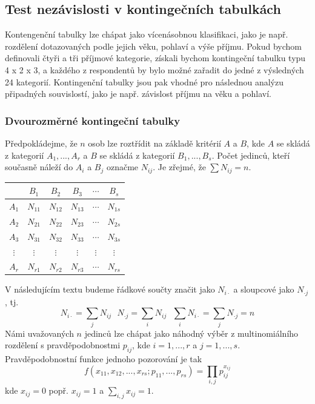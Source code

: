 \subsection{Test nezávislosti v kontingečních tabulkách}

Kontengenční tabulky lze chápat jako vícenásobnou klasifikaci, jako je např. rozdělení dotazovaných podle jejich věku, pohlaví a výše příjmu. Pokud bychom definovali čtyři a tři příjmové kategorie, získali bychom kontingeční tabulku typu 4 x 2 x 3, a každého z respondentů by bylo možné zařadit do jedné z výsledných 24 kategorií. Kontingenční tabulky jsou pak vhodné pro následnou analýzu připadných souvislostí, jako je např. závislost příjmu na věku a pohlaví.

\subsubsection{Dvourozměrné kontingeční tabulky}

Předpokládejme, že $n$ osob lze roztřídit na základě kritérií $A$ a $B$, kde $A$ se skládá z kategorií $A_1, ..., A_r$ a $B$ se skládá z kategorií $B_1, ..., B_s$. Počet jedinců, kteří současně náleží do $A_i$ a $B_j$ označme $N_{ij}$. Je zřejmé, že $\sum N_{ij} = n$.
\begin{center}
  \begin{tabular}{|c|c|c|c|c|c|}
    \hline
    \textbf{} & \textbf{$B_1$} & \textbf{$B_2$} & \textbf{$B_3$} & \textbf{$\cdots$} & \textbf{$B_s$}\\
    \hline
    \textbf{$A_1$} & $N_{11}$ & $N_{12}$ & $N_{13}$ & $\cdots$ & $N_{1s}$\\
    \hline
    \textbf{$A_2$} & $N_{21}$ & $N_{22}$ & $N_{23}$ & $\cdots$ & $N_{2s}$\\
    \hline
    \textbf{$A_3$} & $N_{31}$ & $N_{32}$ & $N_{33}$ & $\cdots$ & $N_{3s}$\\
    \hline
    \textbf{$\vdots$} & $\vdots$ & $\vdots$ & $\vdots$ & $\vdots$ & $\vdots$\\
    \hline
    \textbf{$A_r$} & $N_{r1}$ & $N_{r2}$ & $N_{r3}$ & $\cdots$ & $N_{rs}$\\
    \hline
  \end{tabular}
\end{center}
V následujícím textu budeme řádkové součty značit jako $N_{i \cdot}$ a sloupcové jako $N_{\cdot j}$, tj.
\begin{equation*}
N_{i \cdot} = \sum_j N_{ij} ~~~ N_{\cdot j} = \sum_i N_{ij} ~~~ \sum_i N_{i \cdot} = \sum_j N_{\cdot j} = n
\end{equation*}
Námi uvažovaných $n$ jedinců lze chápat jako náhodný výběr z multinomiálního rozdělení s pravděpodobnostmi $p_{ij}$, kde $i = 1, ..., r$ a $j = 1, ..., s$. Pravděpodobnostní funkce jednoho pozorování je tak
\begin{equation*}
f(x_{11}, x_{12}, ..., x_{rs}; p_{11}, ..., p_{rs}) = \prod_{i,j} p_{ij}^{x_{ij}}
\end{equation*}
kde
$x_{ij} = 0$ popř. $x_{ij} = 1$ a $\sum_{i,j}x_{ij} = 1$.

